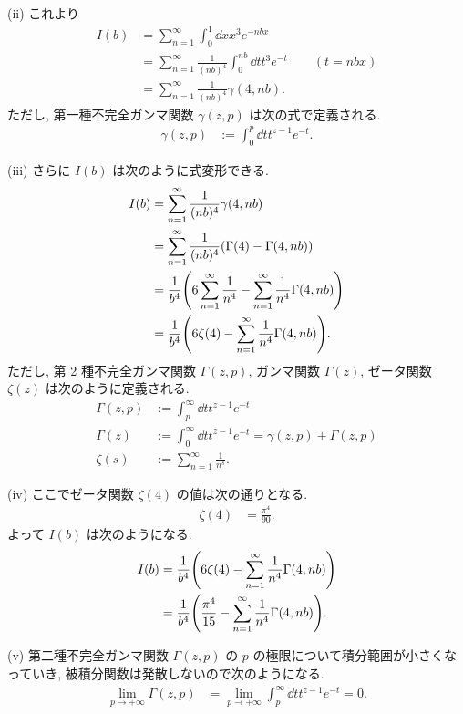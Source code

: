 \documentclass[uplatex,dvipdfmx,a4paper,11pt]{jlreq}
\theoremstyle{definition}
\begin{document}
(ii) これより
\begin{align}
  I(b) & = \sum_{n=1}^{\infty}\int_0^1\dd{x}x^3e^{-nbx}                                   \\
       & = \sum_{n=1}^{\infty}\frac{1}{(nb)^4}\int_0^{nb}\dd{t}t^3e^{-t} \qquad (t = nbx) \\
       & = \sum_{n=1}^{\infty}\frac{1}{(nb)^4}\gamma(4, nb).
\end{align}
ただし, 第一種不完全ガンマ関数 $\gamma(z, p)$ は次の式で定義される.
\begin{align}
  \gamma(z, p) & := \int_0^p\dd{t}t^{z-1}e^{-t}.
\end{align}

(iii)
さらに $I(b)$ は次のように式変形できる.
\begin{align}
  I(b) & = \sum_{n=1}^{\infty}\frac{1}{(nb)^4}\gamma(4, nb)                                                     \\
       & = \sum_{n=1}^{\infty}\frac{1}{(nb)^4}(\Gamma(4) - \Gamma(4, nb))                                       \\
       & = \frac{1}{b^4}\qty(6\sum_{n=1}^{\infty}\frac{1}{n^4} - \sum_{n=1}^{\infty}\frac{1}{n^4}\Gamma(4, nb)) \\
       & = \frac{1}{b^4}\qty(6\zeta(4) - \sum_{n=1}^{\infty}\frac{1}{n^4}\Gamma(4, nb)).
\end{align}
ただし, 第 2 種不完全ガンマ関数 $\Gamma(z, p)$, ガンマ関数 $\Gamma(z)$, ゼータ関数 $\zeta(z)$ は次のように定義される.
\begin{align}
  \Gamma(z, p) & := \int_p^\infty\dd{t}t^{z-1}e^{-t}                               \\
  \Gamma(z)    & := \int_0^\infty\dd{t}t^{z-1}e^{-t} = \gamma(z, p) + \Gamma(z, p) \\
  \zeta(s)     & := \sum_{n=1}^{\infty}\frac{1}{n^s}.
\end{align}

(iv)
ここでゼータ関数 $\zeta(4)$ の値は次の通りとなる.
\begin{align}
  \zeta(4) & = \frac{\pi^4}{90}.
\end{align}
よって $I(b)$ は次のようになる.
\begin{align}
  I(b) & = \frac{1}{b^4}\qty(6\zeta(4) - \sum_{n=1}^{\infty}\frac{1}{n^4}\Gamma(4, nb))         \\
       & = \frac{1}{b^4}\qty(\frac{\pi^4}{15} - \sum_{n=1}^{\infty}\frac{1}{n^4}\Gamma(4, nb)).
\end{align}

(v) 第二種不完全ガンマ関数 $\Gamma(z,p)$ の $p$ の極限について積分範囲が小さくなっていき, 被積分関数は発散しないので次のようになる.
\begin{align}
  \lim_{p\to+\infty}\Gamma(z, p) & = \lim_{p\to+\infty}\int_p^\infty\dd{t}t^{z-1}e^{-t} = 0.
\end{align}
\end{document}
